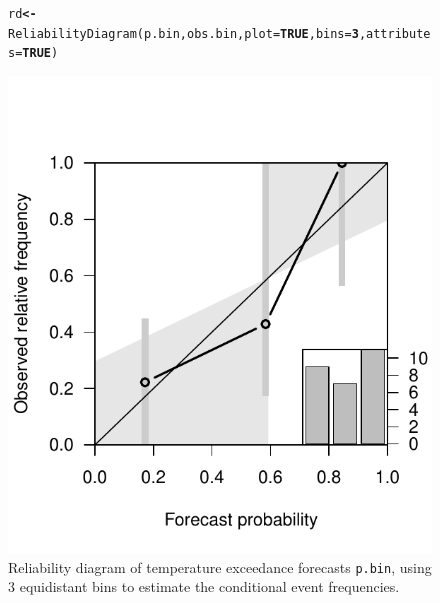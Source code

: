\documentclass[10pt]{article}\usepackage[]{graphicx}\usepackage[]{color}
\makeatletter
\def\maxwidth{ %
  \ifdim\Gin@nat@width>\linewidth
    \linewidth
  \else
    \Gin@nat@width
  \fi
}
\newcommand{\hlnum}[1]{\textcolor[rgb]{0.502,0,0.502}{\textbf{#1}}}%
\newcommand{\hlstd}[1]{\textcolor[rgb]{0,0,0}{#1}}%
\newcommand{\hlkwb}[1]{\textcolor[rgb]{0.502,0.502,0.753}{\textbf{#1}}}%
\newcommand{\hlkwc}[1]{\textcolor[rgb]{0,0.502,0.753}{#1}}%
\newcommand{\hlkwd}[1]{\textcolor[rgb]{0,0.267,0.4}{#1}}%
\newenvironment{kframe}{%
 \def\at@end@of@kframe{}%
 \ifinner\ifhmode%
  \def\at@end@of@kframe{\end{minipage}}%
  \begin{minipage}{\columnwidth}%
 \fi\fi%
 \def\FrameCommand##1{\hskip\@totalleftmargin \hskip-\fboxsep
 \colorbox{shadecolor}{##1}\hskip-\fboxsep
     \hskip-\linewidth \hskip-\@totalleftmargin \hskip\columnwidth}%
 \MakeFramed {\advance\hsize-\width
   \@totalleftmargin\z@ \linewidth\hsize
   \@setminipage}}%
 {\par\unskip\endMakeFramed%
 \at@end@of@kframe}
\newenvironment{knitrout}{}{} %
\newcommand{\code}[1]{\texttt{#1}}
\makeatother
\begin{document}
\begin{figure}
\begin{center}
%
\begin{knitrout}
\color{fgcolor}\begin{kframe}
\begin{alltt}
\hlstd{rd} \hlkwb{<-} \hlkwd{ReliabilityDiagram}\hlstd{(p.bin, obs.bin,} \hlkwc{plot}\hlstd{=}\hlnum{TRUE}\hlstd{,} \hlkwc{bins}\hlstd{=}\hlnum{3}\hlstd{,} \hlkwc{attributes}\hlstd{=}\hlnum{TRUE}\hlstd{)}
\end{alltt}
\end{kframe}
\includegraphics[width=\maxwidth]{figure/reldiag-1} 

\end{knitrout}
%
\end{center}
\caption{Reliability diagram of temperature exceedance forecasts \code{p.bin}, using 3 equidistant bins to estimate the conditional event frequencies.} 
\label{reldiag-plot}
\end{figure}
\end{document}
